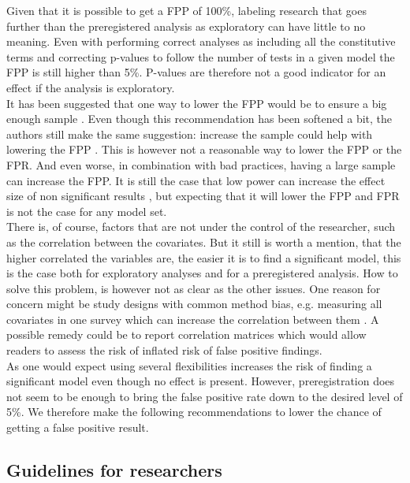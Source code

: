 Given that it is possible to get a FPP of 100\%, labeling research that goes further than the preregistered analysis as exploratory can have little to no meaning. Even with performing correct analyses as including all the constitutive terms and correcting p-values to follow the number of tests in a given model the FPP is still higher than 5\%. P-values are therefore not a good indicator for an effect if the analysis is exploratory. \\
    
It has been suggested that one way to lower the FPP would be to ensure a big enough sample \citep{Simmons2011}. Even though this recommendation has been softened a bit, the authors still make the same suggestion: increase the sample could help with lowering the FPP \cite{simmons2018}. This is however not a reasonable way to lower the FPP or the FPR. And even worse, in combination with bad practices, having a large sample can increase the FPP. It is still the case that low power can increase the effect size of non significant results \citep{loken2017measurement}, but expecting that it will lower the FPP and FPR is not the case for any model set. \\

There is, of course, factors that are not under the control of the researcher, such as the correlation between the covariates. But it still is worth a mention, that the higher correlated the variables are, the easier it is to find a significant model, this is the case both for exploratory analyses and for a preregistered analysis. How to solve this problem, is however not as clear as the other issues. One reason for concern might be study designs with common method bias, e.g. measuring all covariates in one survey which can increase the correlation between them \citep{podsakoff2003}. A possible remedy could be to report correlation matrices which would allow readers to assess the risk of inflated risk of false positive findings.  \\ 

As one would expect using several flexibilities increases the risk of finding a significant model even though no effect is present. However, preregistration does not seem to be enough to bring the false positive rate down to the desired level of 5\%. We therefore make the following recommendations to lower the chance of getting a false positive result. 

\subsection{Guidelines for researchers}

